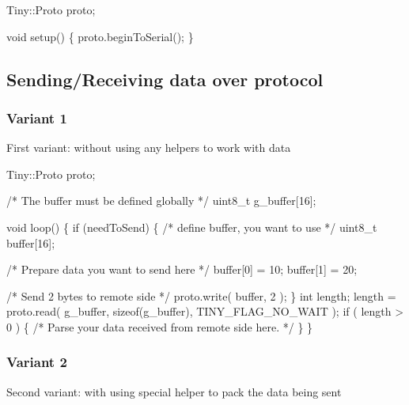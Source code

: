 \begin{DoxyCode}
Tiny::Proto proto;

\textcolor{keywordtype}{void} setup()
\{
    proto.beginToSerial();
\}
\end{DoxyCode}
\hypertarget{arduino_arduino_tiny_send}{}\subsection{Sending/\+Receiving data over protocol}\label{arduino_arduino_tiny_send}
\hypertarget{arduino_arduino_tiny_send_receive1}{}\subsubsection{Variant 1}\label{arduino_arduino_tiny_send_receive1}
First variant\+: without using any helpers to work with data 
\begin{DoxyCode}
Tiny::Proto proto;

\textcolor{comment}{/* The buffer must be defined globally */}
uint8\_t g\_buffer[16];

\textcolor{keywordtype}{void} loop()
\{
    \textcolor{keywordflow}{if} (needToSend)
    \{
        \textcolor{comment}{/* define buffer, you want to use */}
        uint8\_t buffer[16];

        \textcolor{comment}{/* Prepare data you want to send here */}
        buffer[0] = 10;
        buffer[1] = 20;

        \textcolor{comment}{/* Send 2 bytes to remote side */}
        proto.write( buffer, 2 );
    \}
    \textcolor{keywordtype}{int} length;
    length = proto.read( g\_buffer, \textcolor{keyword}{sizeof}(g\_buffer), TINY\_FLAG\_NO\_WAIT );
    \textcolor{keywordflow}{if} ( length > 0 )
    \{
        \textcolor{comment}{/* Parse your data received from remote side here. */}
    \}
\}
\end{DoxyCode}
\hypertarget{arduino_arduino_tiny_send_receive2}{}\subsubsection{Variant 2}\label{arduino_arduino_tiny_send_receive2}
Second variant\+: with using special helper to pack the data being sent 
